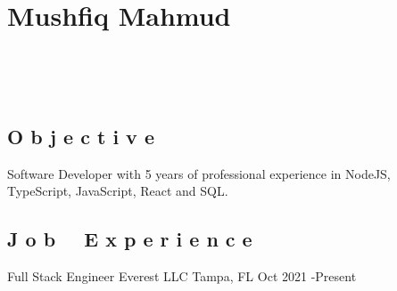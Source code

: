 \documentclass{resume}
\begin{document}

\section{Mushfiq Mahmud}

\begin{center}
	 \hspace{2mm}
	\address{Tampa, FL} \hspace{2mm}
	 \\
	\vspace{1mm}

	 \hspace{1mm}
	 \hspace{1mm}
	 \\
	\vspace{-3mm}
\end{center}


\subsection{O b j e c t i v e}
\small Software Developer with 5 years of professional experience in NodeJS, TypeScript, JavaScript, React and SQL.


\subsection{J o b \ \ E x p e r i e n c e}

\jobInfoLocationDate
  {Full Stack Engineer}
  {Everest LLC}
  {Tampa, FL}
  {Oct 2021 \hyphen Present}

\end{document}
